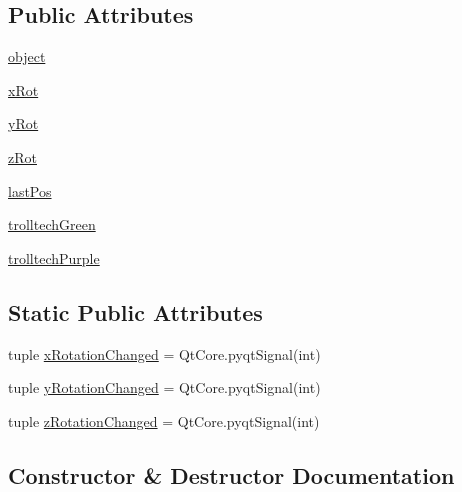 \subsection*{Public Attributes}
\begin{DoxyCompactItemize}
\item 
\hyperlink{classhellogl_1_1GLWidget_a76e1fe3834e975633eb82f7119c415ab}{object}
\item 
\hyperlink{classhellogl_1_1GLWidget_a6c2f6f96eb4530c37f062f7b37e08537}{x\+Rot}
\item 
\hyperlink{classhellogl_1_1GLWidget_a3667543b5ddf18382b653d6ae4bd364f}{y\+Rot}
\item 
\hyperlink{classhellogl_1_1GLWidget_a5360490bcccd77eac45048c5141670ae}{z\+Rot}
\item 
\hyperlink{classhellogl_1_1GLWidget_a1a00e3b4bbfd24f8949756f6481107d5}{last\+Pos}
\item 
\hyperlink{classhellogl_1_1GLWidget_a2fbadae3f3e6bdd63e1b5e24d018302a}{trolltech\+Green}
\item 
\hyperlink{classhellogl_1_1GLWidget_a0a3eaeec1f100898505c1934fd8ee678}{trolltech\+Purple}
\end{DoxyCompactItemize}
\subsection*{Static Public Attributes}
\begin{DoxyCompactItemize}
\item 
tuple \hyperlink{classhellogl_1_1GLWidget_a16ee7afd8306ae8790bddef1fef0818f}{x\+Rotation\+Changed} = Qt\+Core.\+pyqt\+Signal(int)
\item 
tuple \hyperlink{classhellogl_1_1GLWidget_a00f0186cc97df3ecff3576cd7fcfe938}{y\+Rotation\+Changed} = Qt\+Core.\+pyqt\+Signal(int)
\item 
tuple \hyperlink{classhellogl_1_1GLWidget_a048e6dbdc30d5d87b571f066ce3592c8}{z\+Rotation\+Changed} = Qt\+Core.\+pyqt\+Signal(int)
\end{DoxyCompactItemize}


\subsection{Constructor \& Destructor Documentation}
\hypertarget{classhellogl_1_1GLWidget_a0cda9d4f073d0a59bb799c6ebd9f491a}{}
